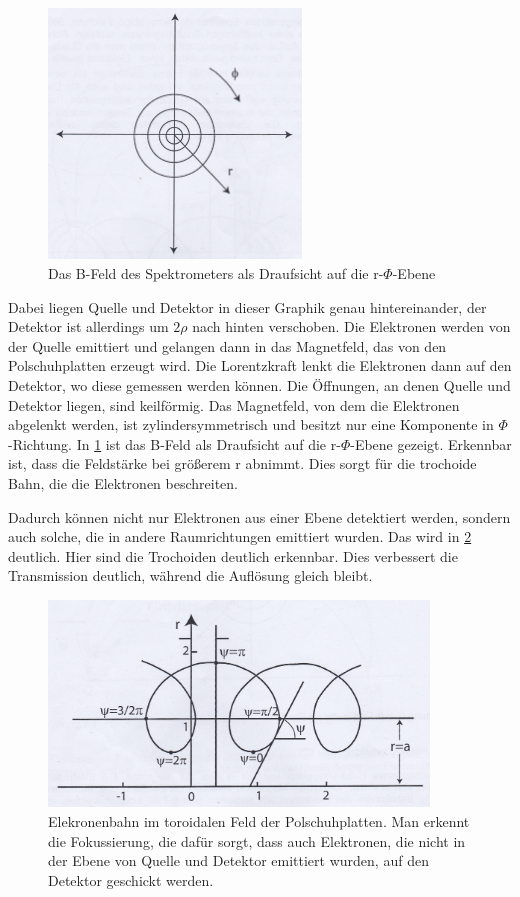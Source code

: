 \begin{figure}[h]
	\centering
	\includegraphics[width=0.6\textwidth]{Feldlinien.jpg}
	\caption{Das B-Feld des Spektrometers als Draufsicht auf die r-$\Phi$-Ebene \cite[18]{anleitung-ws2014}}
	\label{feldlinien}
\end{figure}

Dabei liegen Quelle und Detektor in dieser Graphik genau hintereinander, der Detektor ist allerdings um $2\rho$ nach hinten verschoben. Die Elektronen werden von der Quelle emittiert und gelangen dann in das Magnetfeld, das von den Polschuhplatten erzeugt wird. Die Lorentzkraft lenkt die Elektronen dann auf den Detektor, wo diese gemessen werden können. Die Öffnungen, an denen Quelle und Detektor liegen, sind keilförmig. Das Magnetfeld, von dem die Elektronen abgelenkt werden, ist zylindersymmetrisch und besitzt nur eine Komponente in $\Phi$-Richtung. In \cref{feldlinien} ist das B-Feld als Draufsicht auf die r-$\Phi$-Ebene gezeigt. Erkennbar ist, dass die Feldstärke bei größerem r abnimmt. Dies sorgt für die trochoide Bahn, die die Elektronen beschreiten. 

Dadurch können nicht nur Elektronen aus einer Ebene detektiert werden, sondern auch solche, die in andere Raumrichtungen emittiert wurden. Das wird in \cref{ebahn} deutlich. Hier sind die Trochoiden deutlich erkennbar. Dies verbessert die Transmission deutlich, während die Auflösung gleich bleibt.

\begin{figure}[p]
	\centering
	\includegraphics[width=0.9\textwidth]{Elektronenbahn.jpg}
	\caption{Elekronenbahn im toroidalen Feld der Polschuhplatten. Man erkennt die Fokussierung, die dafür sorgt, dass auch Elektronen, die nicht in der Ebene von Quelle und Detektor emittiert wurden, auf den Detektor geschickt werden. \cite[19]{anleitung-ws2014}}
	\label{ebahn}
\end{figure}

